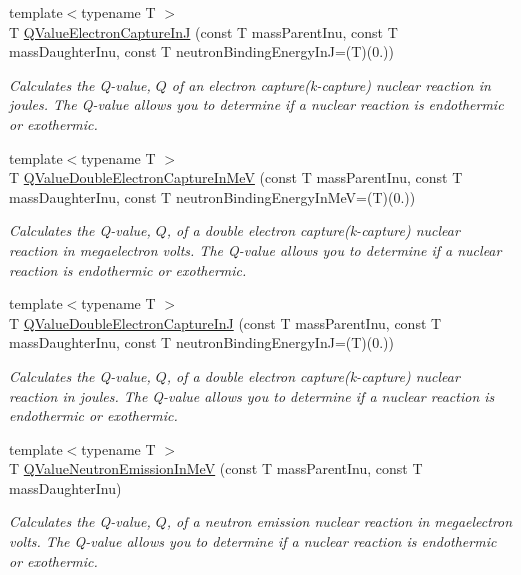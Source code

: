 \begin{DoxyCompactItemize}
{\footnotesize template$<$typename T $>$ }\\T \mbox{\hyperlink{group___e_g_x_phys-_q_value-_electron_capture_gaf2569f9c706130b730dcf55695780263}{Q\+Value\+Electron\+Capture\+InJ}} (const T mass\+Parent\+Inu, const T mass\+Daughter\+Inu, const T neutron\+Binding\+Energy\+InJ=(T)(0.))
\begin{DoxyCompactList}\small\item\em Calculates the Q-\/value, $Q$ of an electron capture(k-\/capture) nuclear reaction in joules. The Q-\/value allows you to determine if a nuclear reaction is endothermic or exothermic. \end{DoxyCompactList}\item 
{\footnotesize template$<$typename T $>$ }\\T \mbox{\hyperlink{group___e_g_x_phys-_q_value-_electron_capture_gab16ac92ae27b2c0c96c7abc35f949cb8}{Q\+Value\+Double\+Electron\+Capture\+In\+MeV}} (const T mass\+Parent\+Inu, const T mass\+Daughter\+Inu, const T neutron\+Binding\+Energy\+In\+MeV=(T)(0.))
\begin{DoxyCompactList}\small\item\em Calculates the Q-\/value, $Q$, of a double electron capture(k-\/capture) nuclear reaction in megaelectron volts. The Q-\/value allows you to determine if a nuclear reaction is endothermic or exothermic. \end{DoxyCompactList}\item 
{\footnotesize template$<$typename T $>$ }\\T \mbox{\hyperlink{group___e_g_x_phys-_q_value-_electron_capture_gacb431a07ac565f8e48a08c25544e5d22}{Q\+Value\+Double\+Electron\+Capture\+InJ}} (const T mass\+Parent\+Inu, const T mass\+Daughter\+Inu, const T neutron\+Binding\+Energy\+InJ=(T)(0.))
\begin{DoxyCompactList}\small\item\em Calculates the Q-\/value, $Q$, of a double electron capture(k-\/capture) nuclear reaction in joules. The Q-\/value allows you to determine if a nuclear reaction is endothermic or exothermic. \end{DoxyCompactList}\item 
{\footnotesize template$<$typename T $>$ }\\T \mbox{\hyperlink{group___e_g_x_phys-_q_value-_neutron_emission_ga8ad6e53cb04260eb9b140e22b5b6d9f6}{Q\+Value\+Neutron\+Emission\+In\+MeV}} (const T mass\+Parent\+Inu, const T mass\+Daughter\+Inu)
\begin{DoxyCompactList}\small\item\em Calculates the Q-\/value, $Q$, of a neutron emission nuclear reaction in megaelectron volts. The Q-\/value allows you to determine if a nuclear reaction is endothermic or exothermic. \end{DoxyCompactList}\item 

\end{DoxyCompactItemize}
